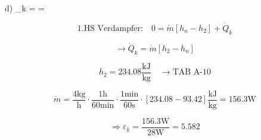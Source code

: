 d) \quad \varepsilon_k =  = 

\[
1. \text{HS Verdampfer:} \quad 0 = \dot{m} [h_n - h_2] + \dot{Q}_k
\]

\[
\rightarrow \dot{Q}_k = \dot{m} [h_2 - h_n]
\]

\[
h_2 = 234.08 \frac{\text{kJ}}{\text{kg}} \quad \rightarrow \text{TAB A-10}
\]

\[
\dot{m} = \frac{4 \text{kg}}{\text{h}} \cdot \frac{1 \text{h}}{60 \text{min}} \cdot \frac{1 \text{min}}{60 \text{s}} \cdot [234.08 - 93.42] \frac{\text{kJ}}{\text{kg}} = 156.3 \text{W}
\]

\[
\Rightarrow \varepsilon_k = \frac{156.3 \text{W}}{28 \text{W}} = 5.582
\]